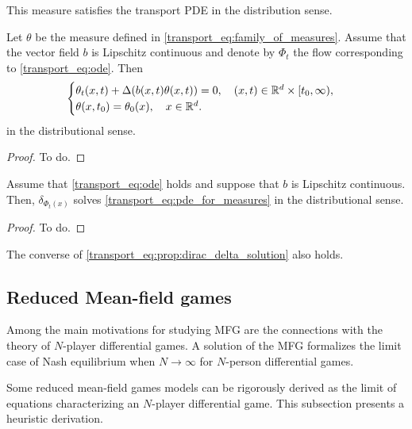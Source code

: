 \documentclass{article}
\begin{document}
This measure satisfies the transport PDE in the distribution sense. 
\begin{proposition}
Let $\theta$ be the measure defined in \eqref{transport_eq:family_of_measures}. Assume that the vector field $b$ is Lipschitz continuous and denote by $\Phi_t$ the flow corresponding to \eqref{transport_eq:ode}. Then
\begin{equation}\label{transport_eq:pde_for_measures}
    \begin{cases}
        \theta_t(x,t) + \Delta(b(x,t) \theta(x,t)) = 0, \quad (x,t) \in \mathbb{R}^d \times [t_0,\infty),\\
        \theta(x,t_0) = \theta_0(x), \quad x\in \mathbb{R}^d.
    \end{cases}
\end{equation}
in the distributional sense.
\end{proposition}

\begin{proof}
    To do.
\end{proof}

\begin{proposition}\label{transport_eq:prop:dirac_delta_solution}
Assume that \eqref{transport_eq:ode} holds and suppose that $b$ is Lipschitz continuous. Then, $\delta_{\Phi_t(x)}$ solves \eqref{transport_eq:pde_for_measures} in the distributional sense.
\end{proposition}

\begin{proof}
    To do.
\end{proof}

\begin{remark} The converse of \eqref{transport_eq:prop:dirac_delta_solution} also holds.
\end{remark}

\subsection{Reduced Mean-field games}\label{reduced_mfg}
Among the main motivations for studying MFG are the connections with the theory of $N$-player differential games. A solution of the MFG formalizes the limit case of Nash equilibrium when $N \to \infty$ for $N$-person differential games.

Some reduced mean-field games models can be rigorously derived as the limit of equations characterizing an $N$-player differential game. This subsection presents a heuristic derivation.
\end{document}
